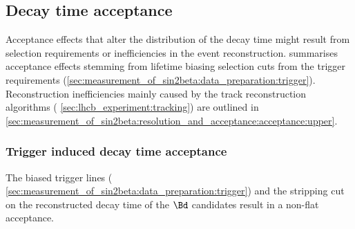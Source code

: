 \subsection{Decay time acceptance}
\label{sec:measurement_of_sin2beta:resolution_and_acceptance:acceptance}

Acceptance effects that alter the distribution of the decay time might result
from selection requirements or inefficiencies in the event reconstruction.
summarises acceptance effects stemming from lifetime biasing selection cuts from
the trigger requirements
(\cf \cref{sec:measurement_of_sin2beta:data_preparation:trigger}). Reconstruction
inefficiencies mainly caused by the \VELO track reconstruction algorithms (\cf
\cref{sec:lhcb_experiment:tracking}) are outlined in
\cref{sec:measurement_of_sin2beta:resolution_and_acceptance:acceptance:upper}.

\subsubsection{Trigger induced decay time acceptance}
\label{sec:measurement_of_sin2beta:resolution_and_acceptance:acceptance:lower}

The biased trigger lines (\cf
\cref{sec:measurement_of_sin2beta:data_preparation:trigger}) and the stripping
cut on the reconstructed decay time of the $\Bd$ candidates result in a non-flat
acceptance.

